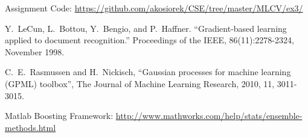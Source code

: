 \documentclass[journal, a4paper]{IEEEtran}
\begin{document}
\begin{thebibliography}{5}

    Assignment Code: \url{https://github.com/akosiorek/CSE/tree/master/MLCV/ex3/}

    Y.~LeCun, L.~Bottou, Y.~Bengio, and P.~Haffner. ``Gradient-based learning applied to document recognition.'' Proceedings of the IEEE, 86(11):2278-2324, November 1998.

    C.~E.~Rasmussen and H.~Nickisch, ``Gaussian processes for machine learning (GPML) toolbox'', The Journal of Machine Learning Research, 2010, 11, 3011-3015.
    
    Matlab Boosting Framework: \url{http://www.mathworks.com/help/stats/ensemble-methods.html}    
    

\end{thebibliography}

\end{document}
